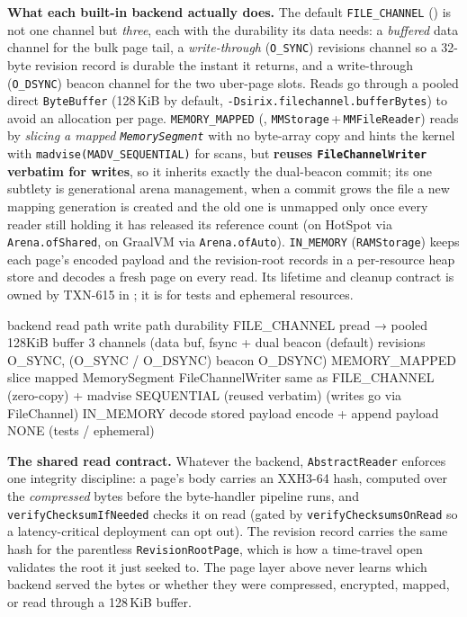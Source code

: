 \documentclass[11pt,a4paper,oneside]{report}
\newcommand{\dcap}[1]{\par\vspace{1pt}\noindent{\small\sffamily\bfseries\color{slate}#1}\par\vspace{-2pt}}
\theoremstyle{sirixthm}
\newcommand{\code}[1]{\texttt{#1}}
\begin{document}
\textbf{What each built-in backend actually does.} The default \code{FILE\_CHANNEL}
() is not one channel but \emph{three}, each with the durability its data
needs: a \emph{buffered} data channel for the bulk page tail, a \emph{write-through} (\code{O\_SYNC})
revisions channel so a 32-byte revision record is durable the instant it returns, and a write-through
(\code{O\_DSYNC}) beacon channel for the two uber-page slots. Reads go through a pooled direct
\code{ByteBuffer} (128\,KiB by default, \code{-Dsirix.filechannel.bufferBytes}) to avoid an allocation per
page. \code{MEMORY\_MAPPED} (, \code{MMStorage}\,+\,\code{MMFileReader})
reads by \emph{slicing a mapped \code{MemorySegment}} with no byte-array copy and hints the kernel with
\code{madvise(MADV\_SEQUENTIAL)} for scans, but \textbf{reuses \code{FileChannelWriter} verbatim for
writes}, so it inherits exactly the dual-beacon commit; its one subtlety is generational arena
management, when a commit grows the file a new mapping generation is created and the old one is unmapped
only once every reader still holding it has released its reference count (on HotSpot via
\code{Arena.ofShared}, on GraalVM via \code{Arena.ofAuto}). \code{IN\_MEMORY} (\code{RAMStorage}) keeps
each page's encoded payload and the revision-root records in a per-resource heap store and decodes
a fresh page on every read. Its lifetime and cleanup contract is owned by TXN-615 in
; it is for tests and ephemeral resources.

\dcap{The built-in backends, by durability and copy behaviour}
\begin{diagramS}
backend        read path                       write path                durability
FILE_CHANNEL   pread → pooled 128KiB buffer     3 channels (data buf,     fsync + dual beacon
               (default)                         revisions O_SYNC,         (O_SYNC / O_DSYNC)
                                                 beacon O_DSYNC)
MEMORY_MAPPED  slice mapped MemorySegment       FileChannelWriter         same as FILE_CHANNEL
               (zero-copy) + madvise SEQUENTIAL  (reused verbatim)         (writes go via FileChannel)
IN_MEMORY      decode stored payload            encode + append payload   NONE (tests / ephemeral)
\end{diagramS}

\textbf{The shared read contract.} Whatever the backend, \code{AbstractReader} enforces one integrity
discipline: a page's body carries an XXH3-64 hash, computed over the \emph{compressed} bytes before the
byte-handler pipeline runs, and \code{verifyChecksumIfNeeded} checks it on read (gated by
\code{verifyChecksumsOnRead} so a latency-critical deployment can opt out). The revision record carries
the same hash for the parentless \code{RevisionRootPage}, which is how a time-travel open validates the
root it just seeked to. The page layer above never learns which backend served the bytes or whether they
were compressed, encrypted, mapped, or read through a 128\,KiB buffer.
\end{document}
